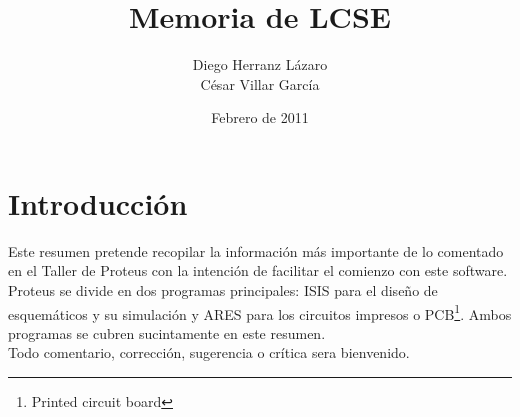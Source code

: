 \documentclass[a4paper, 12pt]{article}
\title{\textbf{Memoria de LCSE}}
\author{Diego Herranz Lázaro\\
	César Villar García}
\date{Febrero de 2011}
\begin{document}
\maketitle


	
\newpage
\tableofcontents

\newpage
\listoffigures

\newpage
\section{Introducción}
	Este resumen pretende recopilar la información más importante de lo comentado en el Taller de Proteus con la intención de facilitar el comienzo con este software. \\
	
	Proteus se divide en dos programas principales: ISIS para el diseño de esquemáticos y su simulación y ARES para los circuitos impresos o PCB\footnote{Printed circuit board}. Ambos programas se cubren sucintamente en este resumen.\\	

	Todo comentario, corrección, sugerencia o crítica sera bienvenido.

\newpage


\newpage


\newpage


\newpage



	
\end{document}
